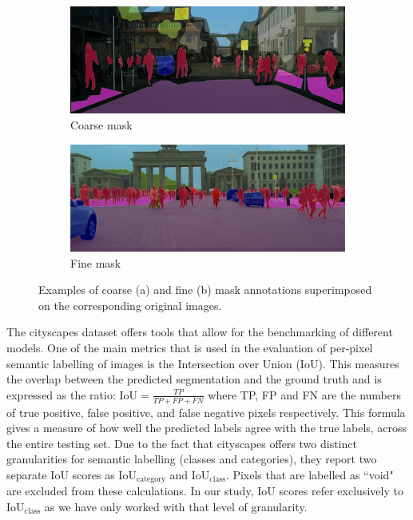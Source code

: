 \begin{figure}[ht]
	\begin{subfigure}{.5\textwidth}
		\includegraphics[width=\textwidth]{coarse_example.jpg}
		\caption{Coarse mask}
	\end{subfigure}
	\begin{subfigure}{.5\textwidth}
		\includegraphics[width=\textwidth]{fine_example.jpg}
		\caption{Fine mask}
	\end{subfigure}
	\caption{Examples of coarse (a) and fine (b) mask annotations superimposed on the corresponding original images.}
	\label{fig:cityscapes}
\end{figure}

The cityscapes dataset offers tools that allow for the benchmarking of different models. One of the main metrics that is used in the evaluation of per-pixel semantic labelling of images is the Intersection over Union (IoU). This measures the overlap between the predicted segmentation and the ground truth and is expressed as the ratio: $\text{IoU} = \frac{TP}{TP + FP + FN}$ where TP, FP and FN are the numbers of true positive, false positive, and false negative pixels respectively. This formula gives a measure of how well the predicted labels agree with the true labels, across the entire testing set. Due to the fact that cityscapes offers two distinct granularities for semantic labelling (classes and categories), they report two separate IoU scores as IoU$_\text{category}$ and IoU$_\text{class}$. Pixels that are labelled as ``void" are excluded from these calculations. In our study, IoU scores refer exclusively to IoU$_\text{class}$ as we have only worked with that level of granularity.

